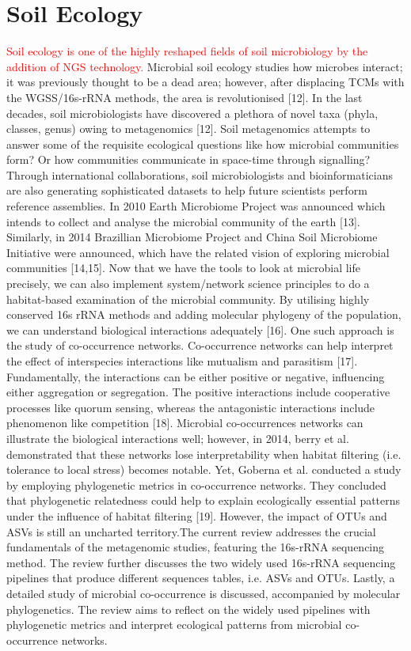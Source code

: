 \section{Soil Ecology}
\textcolor{red}{Soil ecology is one of the highly reshaped fields of soil microbiology by the addition of NGS technology.} Microbial soil ecology studies how microbes interact; it was previously thought to be a dead area; however, after displacing TCMs with the WGSS/16s-rRNA methods, the area is revolutionised [12]. In the last decades, soil microbiologists have discovered a plethora of novel taxa (phyla, classes, genus) owing to metagenomics [12]. Soil metagenomics attempts to answer some of the requisite ecological questions like how microbial communities form? Or how communities communicate in space-time through signalling? Through international collaborations, soil microbiologists and bioinformaticians are also generating sophisticated datasets to help future scientists perform reference assemblies. In 2010 Earth Microbiome Project was announced which intends to collect and analyse the microbial community of the earth [13]. Similarly, in 2014 Brazillian Microbiome Project and China Soil Microbiome Initiative were announced, which have the related vision of exploring microbial communities [14,15]. Now that we have the tools to look at microbial life precisely, we can also implement system/network science principles to do a habitat-based examination of the microbial community. By utilising highly conserved 16s rRNA methods and adding molecular phylogeny of the population, we can understand biological interactions adequately [16]. One such approach is the study of co-occurrence networks. Co-occurrence networks can help interpret the effect of interspecies interactions like mutualism and parasitism [17]. Fundamentally, the interactions can be either positive or negative, influencing either aggregation or segregation. The positive interactions include cooperative processes like quorum sensing, whereas the antagonistic interactions include phenomenon like competition [18]. Microbial co-occurrences networks can illustrate the biological interactions well; however, in 2014, berry et al. demonstrated that these networks lose interpretability when habitat filtering (i.e. tolerance to local stress) becomes notable. Yet, Goberna et al. conducted a study by employing phylogenetic metrics in co-occurrence networks. They concluded that phylogenetic relatedness could help to explain ecologically essential patterns under the influence of habitat filtering [19]. However, the impact of OTUs and ASVs is still an uncharted territory.\newline \newline The current review addresses the crucial fundamentals of the metagenomic studies, featuring the 16s-rRNA sequencing method. The review further discusses the two widely used 16s-rRNA sequencing pipelines that produce different sequences tables, i.e. ASVs and OTUs. Lastly, a detailed study of microbial co-occurrence is discussed, accompanied by molecular phylogenetics. The review aims to reflect on the widely used pipelines with phylogenetic metrics and interpret ecological patterns from microbial co-occurrence networks.